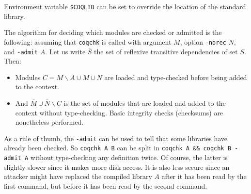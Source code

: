 Environment variable \verb:$COQLIB: can be set to override the
location of the standard library.

The algorithm for deciding which modules are checked or admitted is
the following: assuming that {\tt coqchk} is called with argument $M$,
option {\tt -norec} $N$, and {\tt -admit} $A$. Let us write
$\overline{S}$ the set of reflexive transitive dependencies of set
$S$. Then:
\begin{itemize}
\item Modules $C=\overline{M}\backslash\overline{A}\cup M\cup N$ are
  loaded and type-checked before being added to the context.
\item And $\overline{M}\cup\overline{N}\backslash C$ is the set of
  modules that are loaded and added to the context without
  type-checking. Basic integrity checks (checksums) are nonetheless
  performed.
\end{itemize}

As a rule of thumb, the {\tt -admit} can be used to tell that some
libraries have already been checked. So {\tt coqchk A B} can be split
in {\tt coqchk A \&\& coqchk B -admit A} without type-checking any
definition twice. Of course, the latter is slightly slower since it
makes more disk access. It is also less secure since an attacker might
have replaced the compiled library $A$ after it has been read by the
first command, but before it has been read by the second command.



